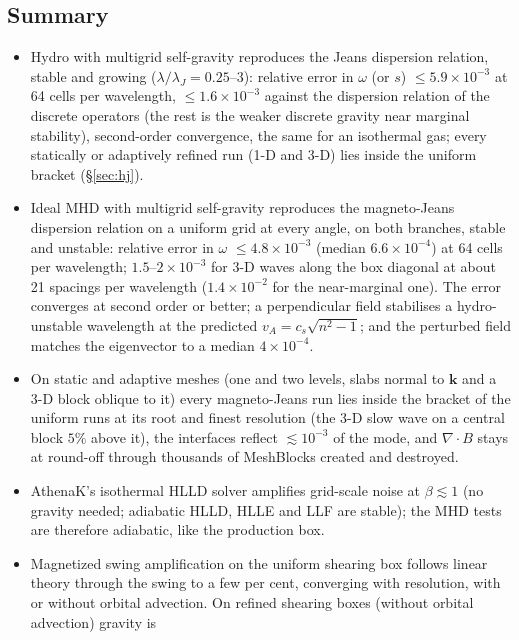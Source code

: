 \documentclass[11pt]{article}
\begin{document}
\subsection{Summary}
\begin{itemize}\itemsep2pt
\item Hydro with multigrid self-gravity reproduces the Jeans dispersion relation, stable and
      growing ($\lambda/\lambda_J = 0.25$--$3$): relative error in $\omega$ (or $s$)
      $\le 5.9\times10^{-3}$ at 64 cells per wavelength, $\le 1.6\times10^{-3}$ against the
      dispersion relation of the discrete operators (the rest is the weaker discrete gravity
      near marginal stability), second-order convergence, the same for an isothermal gas;
      every statically or adaptively refined run (1-D and 3-D) lies inside the uniform
      bracket (\S\ref{sec:hj}).
\item Ideal MHD with multigrid self-gravity reproduces the magneto-Jeans dispersion relation
      on a uniform grid at every angle, on both branches, stable and unstable: relative
      error in $\omega$ $\le 4.8\times10^{-3}$ (median $6.6\times10^{-4}$) at 64 cells per
      wavelength; $1.5$--$2\times10^{-3}$ for 3-D waves along the box diagonal at about 21
      spacings per wavelength ($1.4\times10^{-2}$ for the near-marginal one). The error
      converges at second order or better; a perpendicular field stabilises a
      hydro-unstable wavelength at the predicted $v_A = c_s\sqrt{n^2-1}$; and the perturbed
      field matches the eigenvector to a median $4\times10^{-4}$.
\item On static and adaptive meshes (one and two levels, slabs normal to $\mathbf k$ and a
      3-D block oblique to it) every magneto-Jeans run lies inside the bracket of the
      uniform runs at its root and finest resolution (the 3-D slow wave on a central block
      $5\%$ above it), the interfaces reflect
      $\lesssim 10^{-3}$ of the mode, and $\nabla\!\cdot\!B$ stays at round-off through
      thousands of MeshBlocks created and destroyed.
\item AthenaK's isothermal HLLD solver amplifies grid-scale noise at $\beta \lesssim 1$
      (no gravity needed; adiabatic HLLD, HLLE and LLF are stable); the MHD tests are
      therefore adiabatic, like the production box.
\item Magnetized swing amplification on the uniform shearing box follows linear theory
      through the swing to a few per cent, converging with resolution, with or without
      orbital advection. On refined shearing boxes (without orbital advection) gravity is

\end{itemize}
\end{document}
